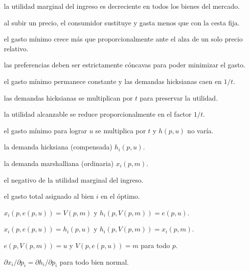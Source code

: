\begin{opts}
    \item la utilidad marginal del ingreso es decreciente en todos los bienes del mercado.
    \item al subir un precio, el consumidor sustituye y gasta menos que con la cesta fija.
    \item el gasto mínimo crece más que proporcionalmente ante el alza de un solo precio relativo.
    \item las preferencias deben ser estrictamente cóncavas para poder minimizar el gasto.
\end{opts}

\begin{opts}
    \item el gasto mínimo permanece constante y las demandas hicksianas caen en $1/t$.
    \item las demandas hicksianas se multiplican por $t$ para preservar la utilidad.
    \item la utilidad alcanzable se reduce proporcionalmente en el factor $1/t$.
    \item el gasto mínimo para lograr $u$ se multiplica por $t$ y $h(p,u)$ no varía.
\end{opts}

\begin{opts}
    \item la demanda hicksiana (compensada) $h_i(p,u)$.
    \item la demanda marshalliana (ordinaria) $x_i(p,m)$.
    \item el negativo de la utilidad marginal del ingreso.
    \item el gasto total asignado al bien $i$ en el óptimo.
\end{opts}

\begin{opts}
    \item $x_i(p, e(p,u)) = V(p,m)$ y $h_i(p, V(p,m)) = e(p,u)$.
    \item $x_i(p, e(p,u)) = h_i(p,u)$ y $h_i(p, V(p,m)) = x_i(p,m)$.
    \item $e(p, V(p,m)) = u$ y $V(p, e(p,u)) = m$ para todo $p$.
    \item $\partial x_i/\partial p_i = \partial h_i/\partial p_i$ para todo bien normal.
\end{opts}

